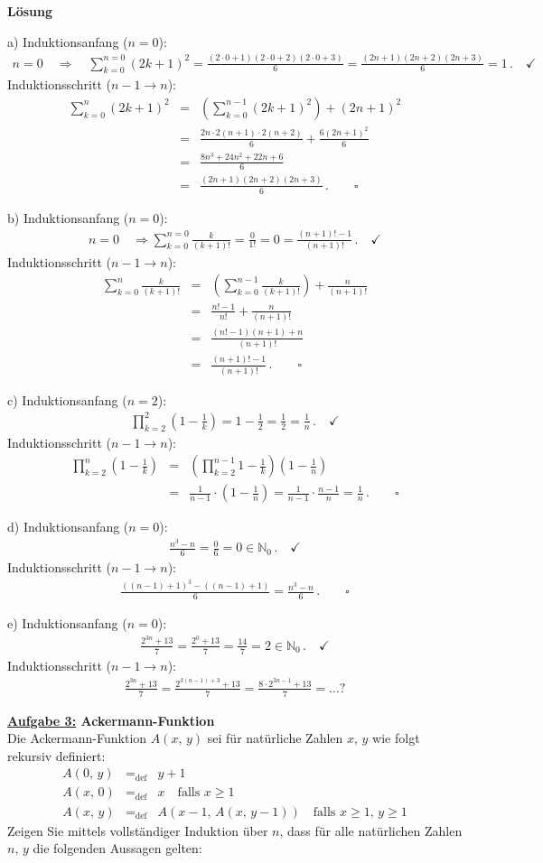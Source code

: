 \documentclass[]{article}
\newcommand{\nn}{\nonumber\\}
\newcommand{\bma}{\begin{eqnarray}}
\newcommand{\ema}{\end{eqnarray}\hspace{-0.015cm}}
\newcommand{\Def}{_{\text{def}}}
\begin{document}
{\bf Lösung}
\begin{list}{}{}
\item[a)]
Induktionsanfang ($n=0$):
\bma
n=0\quad\Rightarrow\quad\sum_{k=0}^{n=0}(2k+1)^2=\frac{(2\cdot0+1)(2\cdot0+2)(2\cdot0+3)}{6}=\frac{(2n+1)(2n+2)(2n+3)}{6}=1\,.\quad\checkmark
\ema
Induktionsschritt ($n{-}1\rightarrow n$):
\bma
\sum_{k=0}^n(2k+1)^2&=&\left(\sum_{k=0}^{n-1}(2k+1)^2\right)+(2n+1)^2\nn
&=&\frac{2n\cdot2(n+1)\cdot2(n+2)}{6}+\frac{6(2n+1)^2}{6}\nn
&=&\frac{8n^3+24n^2+22n+6}{6}\nn
&=&\frac{(2n+1)(2n+2)(2n+3)}{6}\,.\qquad\square
\ema
\item[b)]
Induktionsanfang ($n=0$):
\bma
n=0\quad\Rightarrow\sum_{k=0}^{n=0}\frac{k}{(k+1)!}=\frac{0}{1!}=0=\frac{(n+1)!-1}{(n+1)!}\,.\quad\checkmark
\ema
Induktionsschritt ($n{-}1\rightarrow n$):
\bma
\sum_{k=0}^n\frac{k}{(k+1)!}&=&\left(\sum_{k=0}^{n-1}\frac{k}{(k+1)!}\right)+\frac{n}{(n+1)!}\nn
&=&\frac{n!-1}{n!}+\frac{n}{(n+1)!}\nn
&=&\frac{(n!-1)(n+1)+n}{(n+1)!}\nn
&=&\frac{(n+1)!-1}{(n+1)!}\,.\qquad\square
\ema
\item[c)]
Induktionsanfang ($n=2$):
\bma
\prod_{k=2}^2\left(1-\frac{1}{k}\right)=1-\frac{1}{2}=\frac{1}{2}=\frac{1}{n}\,.\quad\checkmark
\ema
Induktionsschritt ($n{-}1\rightarrow n$):
\bma
\prod_{k=2}^n\left(1-\frac{1}{k}\right)&=&\left(\prod_{k=2}^{n-1}1-\frac{1}{k}\right)\left(1-\frac{1}{n}\right)\nn
&=&\frac{1}{n-1}\cdot\left(1-\frac{1}{n}\right)=\frac{1}{n-1}\cdot\frac{n-1}{n}=\frac{1}{n}\,.\qquad\square
\ema
\item[d)]
Induktionsanfang ($n=0$):
\bma
\frac{n^3-n}{6}=\frac{0}{6}=0\in\mathbb{N}_0\,.\quad\checkmark
\ema
Induktionsschritt ($n{-}1\rightarrow n$):
\bma
\frac{\left((n-1)+1\right)^3-\left((n-1)+1\right)}{6}=\frac{n^3-n}{6}\,.\qquad\square
\ema
\item[e)]
Induktionsanfang ($n=0$):
\bma
\frac{2^{3n}+13}{7}=\frac{2^0+13}{7}=\frac{14}{7}=2\in\mathbb{N}_0\,.\quad\checkmark
\ema
Induktionsschritt ($n{-}1\rightarrow n$):
\bma
\frac{2^{3n}+13}{7}=\frac{2^{3(n-1)+3}+13}{7}=\frac{8\cdot2^{3n-1}+13}{7}=\ldots?
\ema
\end{list}
{\bf\underline{Aufgabe 3:} Ackermann-Funktion}\\[+0.3cm]
Die Ackermann-Funktion $A(x,\,y)$ sei für natürliche Zahlen $x,\,y$ wie folgt rekursiv definiert:
\bma
A(0,\,y)&=\Def&y+1\nn
A(x,\,0)&=\Def&x\quad\text{falls $x\geq1$}\nn
A(x,\,y)&=\Def&A(x-1,\,A(x,\,y-1))\quad\text{falls $x\geq1$, $y\geq1$}
\ema
Zeigen Sie mittels vollständiger Induktion über $n$, dass für alle natürlichen Zahlen $n,\,y$ die folgenden Aussagen gelten:
\end{document}
